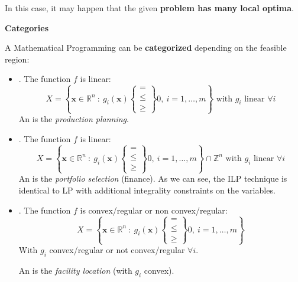 \begin{itemize}
    In this case, it may happen that the given \textbf{problem has many local optima}.
\end{itemize}

\highspace
\begin{flushleft}
    \textcolor{Red2}{ \textbf{Categories}}
\end{flushleft}
A Mathematical Programming can be \textbf{categorized} depending on the feasible region:
\begin{itemize}
    \item {}. The function $f$ is linear:
    \begin{equation*}
        X = \left\{\mathbf{x} \in \mathbb{R}^{n} \: : \: g_{i}\left(\mathbf{x}\right) \begin{Bmatrix}
        = \\ \le \\ \ge
        \end{Bmatrix} 0, \: i = 1, \dots, m\right\} \text{ with } g_{i} \text{ linear } \forall i
    \end{equation*}
    An  is the \emph{production planning}.
    
    \item {}. The function $f$ is linear:
    \begin{equation*}
        X = \left\{\mathbf{x} \in \mathbb{R}^{n} \: : \: g_{i}\left(\mathbf{x}\right) \begin{Bmatrix}
        = \\ \le \\ \ge
        \end{Bmatrix} 0, \: i = 1, \dots, m\right\} \cap \mathbb{Z}^{n} \text{ with } g_{i} \text{ linear } \forall i
    \end{equation*}
    An  is the \emph{portfolio selection} (finance). As we can see, the ILP technique is identical to LP with additional integrality constraints on the variables.
    
    \item {}. The function $f$ is convex/regular or non convex/regular:
    \begin{equation*}
        X = \left\{\mathbf{x} \in \mathbb{R}^{n} \: : \: g_{i}\left(\mathbf{x}\right) \begin{Bmatrix}
        = \\ \le \\ \ge
        \end{Bmatrix} 0, \: i = 1, \dots, m\right\}
    \end{equation*}
    With $g_{i}$ convex/regular or not convex/regular $\forall i$.
    
    An  is the \emph{facility location} (with $g_{i}$ convex).
\end{itemize}

